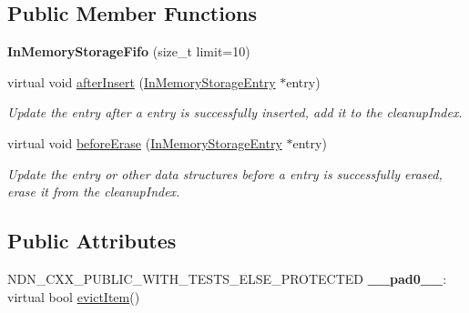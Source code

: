 \subsection*{Public Member Functions}
\begin{DoxyCompactItemize}
\item 
{\bfseries In\+Memory\+Storage\+Fifo} (size\+\_\+t limit=10)\hypertarget{classndn_1_1util_1_1InMemoryStorageFifo_acedf2db4d721dde76c2a87b9fe7c966e}{}\label{classndn_1_1util_1_1InMemoryStorageFifo_acedf2db4d721dde76c2a87b9fe7c966e}

\item 
virtual void \hyperlink{classndn_1_1util_1_1InMemoryStorageFifo_a702b42a75bc1f487cb5dd792b77595f4}{after\+Insert} (\hyperlink{classndn_1_1util_1_1InMemoryStorageEntry}{In\+Memory\+Storage\+Entry} $\ast$entry)\hypertarget{classndn_1_1util_1_1InMemoryStorageFifo_a702b42a75bc1f487cb5dd792b77595f4}{}\label{classndn_1_1util_1_1InMemoryStorageFifo_a702b42a75bc1f487cb5dd792b77595f4}

\begin{DoxyCompactList}\small\item\em Update the entry after a entry is successfully inserted, add it to the cleanup\+Index. \end{DoxyCompactList}\item 
virtual void \hyperlink{classndn_1_1util_1_1InMemoryStorageFifo_a7d322970a1c6ec29e2e2728126bb2f9b}{before\+Erase} (\hyperlink{classndn_1_1util_1_1InMemoryStorageEntry}{In\+Memory\+Storage\+Entry} $\ast$entry)\hypertarget{classndn_1_1util_1_1InMemoryStorageFifo_a7d322970a1c6ec29e2e2728126bb2f9b}{}\label{classndn_1_1util_1_1InMemoryStorageFifo_a7d322970a1c6ec29e2e2728126bb2f9b}

\begin{DoxyCompactList}\small\item\em Update the entry or other data structures before a entry is successfully erased, erase it from the cleanup\+Index. \end{DoxyCompactList}\end{DoxyCompactItemize}
\subsection*{Public Attributes}
\begin{DoxyCompactItemize}
\item 
N\+D\+N\+\_\+\+C\+X\+X\+\_\+\+P\+U\+B\+L\+I\+C\+\_\+\+W\+I\+T\+H\+\_\+\+T\+E\+S\+T\+S\+\_\+\+E\+L\+S\+E\+\_\+\+P\+R\+O\+T\+E\+C\+T\+ED {\bfseries \+\_\+\+\_\+pad0\+\_\+\+\_\+}\+: virtual bool \hyperlink{classndn_1_1util_1_1InMemoryStorage_a14036928e195645bf47d8c5686277fd8}{evict\+Item}()\hypertarget{classndn_1_1util_1_1InMemoryStorageFifo_afdf23f9cbe86c7aec7067ad5a999f76d}{}\label{classndn_1_1util_1_1InMemoryStorageFifo_afdf23f9cbe86c7aec7067ad5a999f76d}

\end{DoxyCompactItemize}

